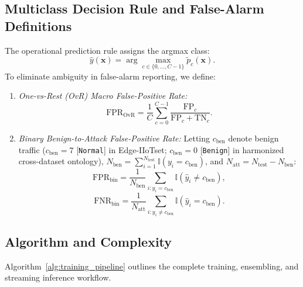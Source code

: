 \documentclass[10pt,journal,twocolumn]{IEEEtran}
\begin{document}
\subsection{Multiclass Decision Rule and False-Alarm Definitions}
The operational prediction rule assigns the argmax class:
\begin{equation}
\hat{y}(\mathbf{x}) = \arg\max_{c \in \{0, \dots, C-1\}} \tilde{p}_c(\mathbf{x}).
\end{equation}
To eliminate ambiguity in false-alarm reporting, we define:
\begin{enumerate}
    \item \emph{One-vs-Rest (OvR) Macro False-Positive Rate:}
    \begin{equation}
    \text{FPR}_{\text{OvR}} = \frac{1}{C} \sum_{c=0}^{C-1} \frac{\text{FP}_c}{\text{FP}_c + \text{TN}_c}.
    \end{equation}
    \item \emph{Binary Benign-to-Attack False-Positive Rate:} Letting $c_{\text{ben}}$ denote benign traffic ($c_{\text{ben}}=7$ [\texttt{Normal}] in Edge-IIoTset; $c_{\text{ben}}=0$ [\texttt{Benign}] in harmonized cross-dataset ontology), $N_{\text{ben}} = \sum_{i=1}^{N_{\text{test}}} \mathbb{I}(y_i = c_{\text{ben}})$, and $N_{\text{att}} = N_{\text{test}} - N_{\text{ben}}$:
    \begin{equation}
    \text{FPR}_{\text{bin}} = \frac{1}{N_{\text{ben}}}\sum_{i: y_i = c_{\text{ben}}} \mathbb{I}(\hat{y}_i \neq c_{\text{ben}}),
    \end{equation}
    \begin{equation}
    \text{FNR}_{\text{bin}} = \frac{1}{N_{\text{att}}}\sum_{i: y_i \neq c_{\text{ben}}} \mathbb{I}(\hat{y}_i = c_{\text{ben}}).
    \end{equation}
\end{enumerate}

\subsection{Algorithm and Complexity}
Algorithm~\ref{alg:training_pipeline} outlines the complete training, ensembling, and streaming inference workflow.
\end{document}
